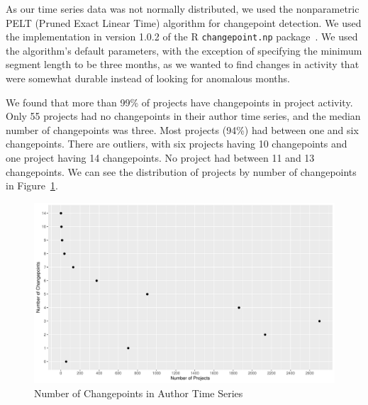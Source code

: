 \documentclass[10pt,conference]{IEEEtran}
\begin{document}
As our time series data was not normally distributed, we used the nonparametric PELT (Pruned Exact Linear Time) algorithm for changepoint detection. We used the implementation in version 1.0.2 of the R \texttt{changepoint.np} package~\cite{killick2014changepoint}. We used the algorithm's default parameters, with the exception of specifying the minimum segment length to be three months, as we wanted to find changes in activity that were somewhat durable instead of looking for anomalous months. 


We found that more than 99\% of projects have changepoints in project activity. Only 55 projects had no changepoints in their author time series, and the median number of changepoints was three. Most projects (94\%) had between one and six changepoints. There are outliers, with six projects having 10 changepoints and one project having 14 changepoints. No project had between 11 and 13 changepoints. We can see the distribution of projects by number of changepoints in Figure~\ref{fig:authorcpts}.
\begin{figure}[ht!]
    \centering
    \includegraphics[width=\linewidth]{author-changepoints.pdf}
    \caption{Number of Changepoints in Author Time Series}
    \label{fig:authorcpts}
\end{figure}
\end{document}
